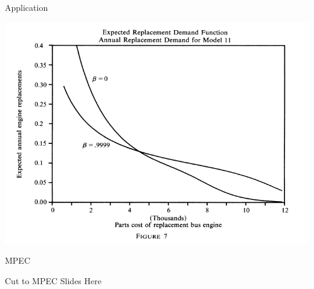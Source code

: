 \documentclass[xcolor=pdftex,dvipsnames,table,mathserif]{beamer}
\begin{document}
\begin{frame}{Application}
\begin{center}
\includegraphics[scale=.8]{./resources/RustF7.pdf}
\end{center}
\end{frame}

\begin{frame}{MPEC}
\begin{center}
Cut to MPEC Slides Here
\end{center}
\end{frame}
\end{document}
